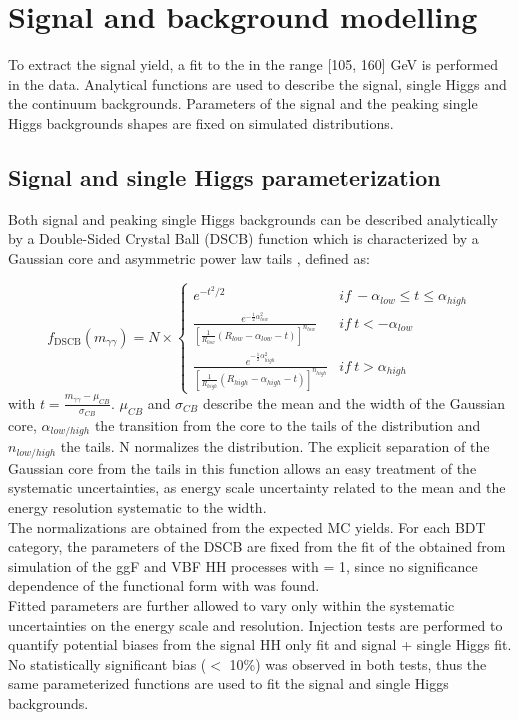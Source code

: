 \section{Signal and background modelling}
\label{HHyybb:Modelling}

To extract the \HHyybb signal yield, a fit to the \myy in the range [105, 160] GeV is performed in the data. Analytical functions are used to describe the signal, single Higgs and the continuum backgrounds. Parameters of the signal and the peaking single Higgs backgrounds shapes are fixed on simulated distributions.

\subsection{Signal and single Higgs parameterization}
\label{HHyybb:Modelling:Sig}

Both signal and peaking single Higgs backgrounds can be described analytically by a Double-Sided Crystal Ball (DSCB) function which is characterized by a Gaussian core and asymmetric power law tails \cite{Higgs_2018}, defined as:

\begin{equation}
    f_{\mathrm{DSCB}}\left(m_{\gamma \gamma}\right)=N \times\left\{\begin{array}{ll}
e^{-t^{2} / 2} &  if \ -\alpha_{low } \leq t \leq \alpha_{high } \\

\frac{e^{-\frac{1}{2} \alpha_{low }^{2}}} {  \left[  \frac{1}{ R_{low} } \left(R_{low }-\alpha_{low }-t\right) \right]^{n_{low }}} & if \ t<-\alpha_{low } \\

\frac{e^{-\frac{1}{2} \alpha_{high }^{2}}} {  \left[  \frac{1}{ R_{high} } \left(R_{high }-\alpha_{high }-t\right) \right]^{n_{high }}} &  if \ t>\alpha_{high }
\end{array}\right.
\end{equation}
with $t = \frac{m_{\gamma\gamma} - \mu_{CB}}{\sigma_{CB}}$. $\mu_{CB}$ and $\sigma_{CB}$ describe the mean and the width of the Gaussian core, $\alpha_{low/high}$ the transition from the core to the tails of the distribution and $n_{low/high}$ the tails. N normalizes the distribution. The explicit separation of the Gaussian core from the tails in this function allows an easy treatment of the systematic uncertainties, as energy scale uncertainty related to the mean and the energy resolution systematic to the width.\\
The normalizations are obtained from the expected MC yields. For each BDT category, the parameters of the DSCB are fixed from the fit of the \myy obtained from simulation of the ggF and VBF HH processes with \kl = 1, since no significance dependence of the functional form with \kl was found. \\
Fitted parameters are further allowed to vary only within the systematic uncertainties on the energy scale and resolution. Injection tests are performed to quantify potential biases from the signal HH only fit and signal + single Higgs fit. No statistically significant bias ($<$ 10\%) was observed in both tests, thus the same parameterized functions are used to fit the signal and single Higgs backgrounds.    

